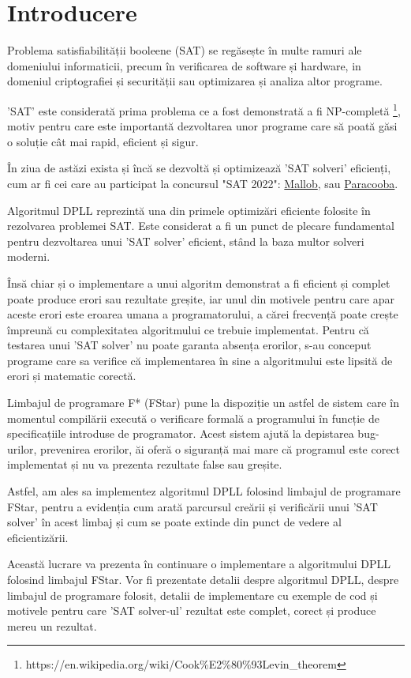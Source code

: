 \chapter*{Introducere} 

Problema satisfiabilității booleene (SAT) se regăsește în multe ramuri ale \linebreak domeniului informaticii, precum în verificarea de software și hardware, in domeniul criptografiei și securității sau optimizarea și analiza altor programe.

'SAT' este considerată prima problema ce a fost demonstrată a fi \linebreak NP-completă \footnote{https://en.wikipedia.org/wiki/Cook\%E2\%80\%93Levin\_theorem}, motiv pentru care este importantă dezvoltarea unor programe care să poată găsi o soluție cât mai rapid, eficient și sigur. 

În ziua de astăzi exista și încă se dezvoltă și optimizează 'SAT solveri' eficienți, cum ar fi cei care au participat la concursul "SAT 2022": \href{https://www.dominikschreiber.de/papers/2022-mallob.pdf}{Mallob}, sau \href{https://github.com/maximaximal/Paracooba#readme
}{Paracooba}.

Algoritmul DPLL reprezintă una din primele optimizări eficiente folosite în \linebreak rezolvarea problemei SAT. Este considerat a fi un punct de plecare fundamental pentru \linebreak dezvoltarea unui 'SAT solver' eficient, stând la baza multor solveri moderni.

Însă chiar și o implementare a unui algoritm demonstrat a fi eficient și complet poate produce erori sau rezultate greșite, iar unul din motivele pentru care apar aceste erori este eroarea umana a programatorului, a cărei frecvență poate crește împreună cu complexitatea algoritmului ce trebuie implementat. Pentru că testarea unui 'SAT solver' nu poate garanta absența erorilor, s-au conceput programe care sa verifice că implementarea în sine a algoritmului este lipsită de erori și matematic corectă.

Limbajul de programare F* (FStar) pune la dispoziție un astfel de sistem care în momentul compilării execută o verificare formală a programului în funcție de \linebreak specificațiile introduse de programator. Acest sistem ajută la depistarea bug-urilor, prevenirea erorilor, ăi oferă o siguranță mai mare că programul este corect \linebreak implementat și nu va prezenta rezultate false sau greșite.

Astfel, am ales sa implementez algoritmul DPLL folosind limbajul de programare FStar, pentru a evidenția cum arată parcursul creării și verificării unui 'SAT solver' în acest limbaj și cum se poate extinde din punct de vedere al eficientizării.

Această lucrare va prezenta în continuare o implementare a algoritmului DPLL folosind limbajul FStar. Vor fi prezentate detalii despre algoritmul DPLL, despre limbajul de programare folosit, detalii de implementare cu exemple de cod și motivele pentru care 'SAT solver-ul' rezultat este complet, corect și produce mereu un rezultat.


